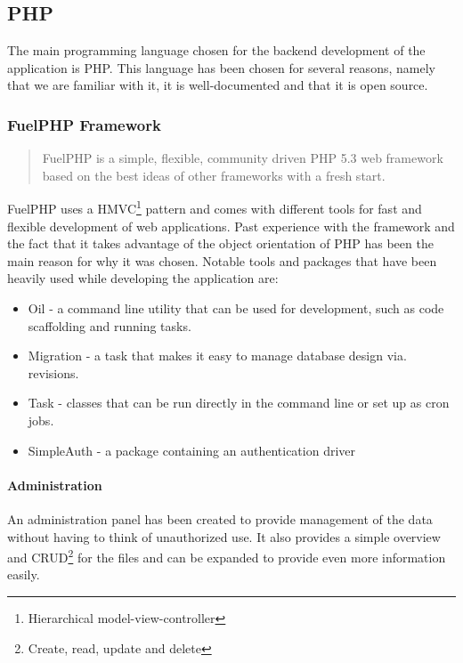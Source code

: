 \subsection{PHP}

The main programming language chosen for the backend development of the application is PHP. This language has been chosen for several reasons, namely that we are familiar with it, it is well-documented and that it is open source.

\subsubsection{FuelPHP Framework}

\begin{quote}
FuelPHP is a simple, flexible, community driven PHP 5.3 web framework based on the best ideas of other frameworks with a fresh start\cite{FuelPHP}.
\end{quote}

FuelPHP uses a HMVC\footnote{Hierarchical model-view-controller} pattern and comes with different tools for fast and flexible development of web applications. Past experience with the framework and the fact that it takes advantage of the object orientation of PHP has been the main reason for why it was chosen. Notable tools and packages that have been heavily used while developing the application are:

\begin{itemize}
\item Oil - a command line utility that can be used for development, such as code scaffolding and running tasks. 
\item Migration - a task that makes it easy to manage database design via. revisions.
\item Task - classes that can be run directly in the command line or set up as cron jobs.
\item SimpleAuth - a package containing an authentication driver
\end{itemize}

\paragraph{Administration}

An administration panel has been created to provide management of the data without having to think of unauthorized use. It also provides a simple overview and CRUD\footnote{Create, read, update and delete} for the \textsf{files} and can be expanded to provide even more information easily.

